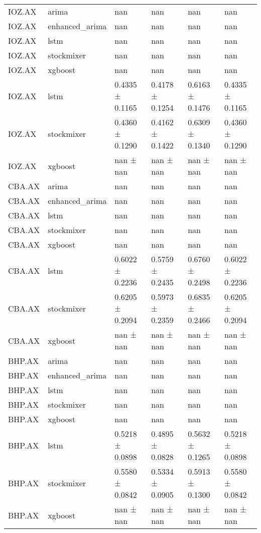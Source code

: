 \begin{table}[h!]
\begin{tabular}{llllll}
IOZ.AX & arima & nan & nan & nan & nan \\
IOZ.AX & enhanced_arima & nan & nan & nan & nan \\
IOZ.AX & lstm & nan & nan & nan & nan \\
IOZ.AX & stockmixer & nan & nan & nan & nan \\
IOZ.AX & xgboost & nan & nan & nan & nan \\
IOZ.AX & lstm & 0.4335 ± 0.1165 & 0.4178 ± 0.1254 & 0.6163 ± 0.1476 & 0.4335 ± 0.1165 \\
IOZ.AX & stockmixer & 0.4360 ± 0.1290 & 0.4162 ± 0.1422 & 0.6309 ± 0.1340 & 0.4360 ± 0.1290 \\
IOZ.AX & xgboost & nan ± nan & nan ± nan & nan ± nan & nan ± nan \\
CBA.AX & arima & nan & nan & nan & nan \\
CBA.AX & enhanced_arima & nan & nan & nan & nan \\
CBA.AX & lstm & nan & nan & nan & nan \\
CBA.AX & stockmixer & nan & nan & nan & nan \\
CBA.AX & xgboost & nan & nan & nan & nan \\
CBA.AX & lstm & 0.6022 ± 0.2236 & 0.5759 ± 0.2435 & 0.6760 ± 0.2498 & 0.6022 ± 0.2236 \\
CBA.AX & stockmixer & 0.6205 ± 0.2094 & 0.5973 ± 0.2359 & 0.6835 ± 0.2466 & 0.6205 ± 0.2094 \\
CBA.AX & xgboost & nan ± nan & nan ± nan & nan ± nan & nan ± nan \\
BHP.AX & arima & nan & nan & nan & nan \\
BHP.AX & enhanced_arima & nan & nan & nan & nan \\
BHP.AX & lstm & nan & nan & nan & nan \\
BHP.AX & stockmixer & nan & nan & nan & nan \\
BHP.AX & xgboost & nan & nan & nan & nan \\
BHP.AX & lstm & 0.5218 ± 0.0898 & 0.4895 ± 0.0828 & 0.5632 ± 0.1265 & 0.5218 ± 0.0898 \\
BHP.AX & stockmixer & 0.5580 ± 0.0842 & 0.5334 ± 0.0905 & 0.5913 ± 0.1300 & 0.5580 ± 0.0842 \\
BHP.AX & xgboost & nan ± nan & nan ± nan & nan ± nan & nan ± nan \\
\bottomrule
\end{tabular}
\end{table}
